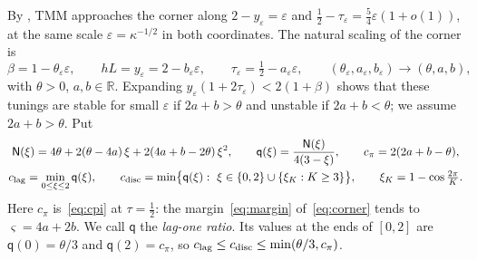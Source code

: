 \documentclass[11pt]{article}
\theoremstyle{definition}
\theoremstyle{remark}
\newcommand{\R}{\mathbb R}
\newcommand{\clag}{c_{\rm lag}}\newcommand{\clayer}{c_{\rm layer}}\newcommand{\cdisc}{c_{\rm disc}}
\newcommand{\cpi}{c_{\pi}}
\begin{document}
By , TMM approaches the corner along
\(2-y_\varepsilon=\varepsilon\) and \(\frac12-\tau_\varepsilon=\frac54\varepsilon(1+o(1))\), at the same scale \(\varepsilon=\kappa^{-1/2}\) in both
coordinates.  The natural scaling of the corner is
\begin{equation}\label{eq:corner}
\beta=1-\theta_\varepsilon\varepsilon,\qquad hL=y_\varepsilon=2-b_\varepsilon\varepsilon,\qquad
\tau_\varepsilon=\tfrac12-a_\varepsilon\varepsilon,\qquad
(\theta_\varepsilon,a_\varepsilon,b_\varepsilon)\to(\theta,a,b),
\end{equation}
with \(\theta>0\), \(a,b\in\R\).  Expanding \(y_\varepsilon(1+2\tau_\varepsilon)<2(1+\beta)\) shows that
these tunings are stable for small \(\varepsilon\) if \(2a+b>\theta\) and unstable if
\(2a+b<\theta\); we assume \(2a+b>\theta\).  Put
\begin{equation}\label{eq:cornerN}
\begin{gathered}
\mathsf N(\xi)=4\theta+2(\theta-4a)\,\xi+2(4a+b-2\theta)\,\xi^2,\qquad
\mathsf q(\xi)=\frac{\mathsf N(\xi)}{4(3-\xi)},\qquad
\cpi=2(2a+b-\theta),\\
\clag=\min_{0\le\xi\le2}\mathsf q(\xi),\qquad
\cdisc=\min\bigl\{\mathsf q(\xi):\ \xi\in\{0,2\}\cup\{\xi_K:K\ge3\}\bigr\},\qquad \xi_K=1-\cos\tfrac{2\pi}K .
\end{gathered}
\end{equation}
Here \(\cpi\) is~\eqref{eq:cpi} at \(\tau=\frac12\): the margin~\eqref{eq:margin} of~\eqref{eq:corner} tends to
\(\varsigma=4a+2b\).  We call \(\mathsf q\) the \emph{lag-one ratio}.  Its values at the ends of \([0,2]\) are \(\mathsf q(0)=\theta/3\)
and \(\mathsf q(2)=\cpi\), so \(\clag\le\cdisc\le\min(\theta/3,\cpi)\).
\end{document}
